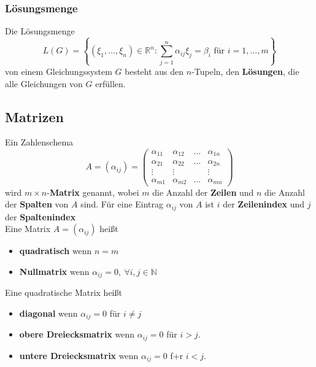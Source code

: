 \documentclass[12pt]{article}
\begin{document}
\subsubsection{Lösungsmenge}
Die Lösungsmenge
\[L(G) = \left\{(\xi_1, \dots, \xi_n) \in \mathbb{R}^n: \sum_{j=1}^{n} \alpha_{ij}\xi_{j} = \beta_i \text{ für } i = 1, \dots, m\right\}\]
von einem Gleichungssystem $G$ besteht aus den $n$-Tupeln, den \textbf{Lösungen}, die alle Gleichungen von $G$ erfüllen.

\newpage
\subsection{Matrizen}
Ein Zahlenschema
\[A = (\alpha_{ij}) = \begin{pmatrix}
    \alpha_{11} & \alpha_{12} & \dots & \alpha_{1n} \\
    \alpha_{21} & \alpha_{22} & \dots & \alpha_{2n} \\
    \vdots & \vdots & & \vdots \\
    \alpha_{m1} & \alpha_{m2} & \dots & \alpha_{mn}
\end{pmatrix}\]
wird $m \times n$-\textbf{Matrix} genannt, wobei $m$ die Anzahl der \textbf{Zeilen} und $n$ die Anzahl der \textbf{Spalten} von $A$ sind.
Für eine Eintrag $\alpha_{ij}$ von $A$ ist $i$ der \textbf{Zeilenindex} und $j$ der \textbf{Spaltenindex} \\
\newline
Eine Matrix $A = (\alpha_{ij})$ heißt
\begin{itemize}
    \item \textbf{quadratisch} wenn $n = m$
    \item \textbf{Nullmatrix} wenn $\alpha_{ij} = 0, \: \forall i,j \in \mathbb{N}$
\end{itemize}
Eine quadratische Matrix heißt
\begin{itemize}
    \item \textbf{diagonal} wenn $\alpha_{ij} = 0$ für $i \neq j$
    \item \textbf{obere Dreiecksmatrix} wenn $\alpha_{ij}= 0$ für $i > j$.
    \item \textbf{untere Dreiecksmatrix} wenn $\alpha_{ij} = 0$ f+r $i < j$.
\end{itemize}
\end{document}
